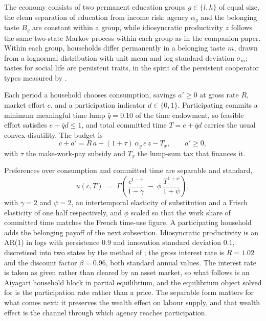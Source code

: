\documentclass[11pt]{article}
\begin{document}
The economy consists of two permanent education groups $g \in \{l, h\}$ of equal size, the clean separation of education from income risk: agency $\alpha_g$ and the belonging taste $B_g$ are constant within a group, while idiosyncratic productivity $z$ follows the same two-state Markov process within each group as in the companion paper. Within each group, households differ permanently in a belonging taste $m$, drawn from a lognormal distribution with unit mean and log standard deviation $\sigma_m$; tastes for social life are persistent traits, in the spirit of the persistent cooperator types measured by \citet{fischbacher2001}.

Each period a household chooses consumption, savings $a' \ge 0$ at gross rate $R$, market effort $e$, and a participation indicator $d \in \{0, 1\}$. Participating commits a minimum meaningful time lump $\bar{q} = 0.10$ of the time endowment, so feasible effort satisfies $e + \bar{q} d \le 1$, and total committed time $T = e + \bar{q} d$ carries the usual convex disutility. The budget is
\begin{equation}
c + a' = R\,a + (1+\tau)\,\alpha_g\, e\, z - T_x, \qquad a' \ge 0,
\end{equation}
with $\tau$ the make-work-pay subsidy and $T_x$ the lump-sum tax that finances it.

Preferences over consumption and committed time are separable and standard,
\begin{equation}
u(c, T) \;=\; \Gamma\left(\frac{c^{1-\gamma}}{1-\gamma} \;-\; \phi\,\frac{T^{1+\psi}}{1+\psi}\right),
\end{equation}
with $\gamma = 2$ and $\psi = 2$, an intertemporal elasticity of substitution and a Frisch elasticity of one half respectively, and $\phi$ scaled so that the work share of committed time matches the French time-use figure. A participating household adds the belonging payoff of the next subsection. Idiosyncratic productivity is an AR(1) in logs with persistence $0.9$ and innovation standard deviation $0.1$, discretised into two states by the method of \citet{rouwenhorst1995}; the gross interest rate is $R = 1.02$ and the discount factor $\beta = 0.96$, both standard annual values. The interest rate is taken as given rather than cleared by an asset market, so what follows is an Aiyagari household block in partial equilibrium, and the equilibrium object solved for is the participation rate rather than a price. The separable form matters for what comes next: it preserves the wealth effect on labour supply, and that wealth effect is the channel through which agency reaches participation.
\end{document}
